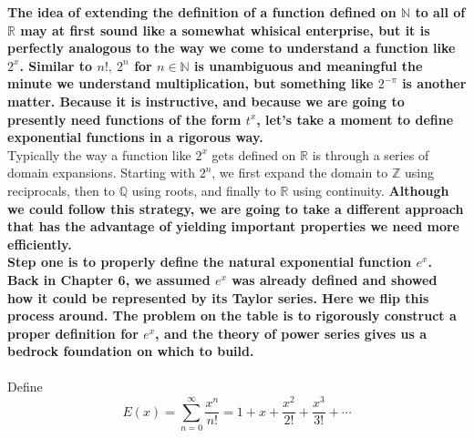 \documentclass{article}
\begin{document}
\begin{spacing}{1.1}
    \textbf{The idea of extending the definition of a function defined on $\mathbb{N}$ to all of $\mathbb{R}$ may at first sound like a somewhat whisical enterprise, but it is perfectly analogous to the way we come to understand a function like $2^x$. Similar to $n!,\ 2^n$ for $n\in\mathbb{N}$ is unambiguous and meaningful the minute we understand multiplication, but something like $2^{-\pi}$ is another matter. Because it is instructive, and because we are going to presently need functions of the form $t^x$, let's take a moment to define exponential functions in a rigorous way.}\\
    Typically the way a function like $2^x$ gets defined on $\mathbb{R}$ is through a series of domain expansions. Starting with $2^n$, we first expand the domain to $\mathbb{Z}$ using reciprocals, then to $\mathbb{Q}$ using roots, and finally to $\mathbb{R}$ using continuity.  \textbf{Although we could follow this strategy, we are going to take a different approach that has the advantage of yielding important properties we need more efficiently.}\\
    \textbf{Step one is to properly define the natural exponential function $e^x$. Back in Chapter 6, we assumed $e^x$ was already defined and showed how it could be represented by its Taylor series. Here we flip this process around. The problem on the table is to rigorously construct a proper definition for $e^x$, and the theory of power series gives us a bedrock foundation on which to build.}
\\\\
\noindent
Define
\[ E(x)=\sum^\infty_{n=0}\frac{x^n}{n!}=1+x+\frac{x^2}{2!}+\frac{x^3}{3!}+\cdots \]


\end{spacing}
\end{document}
